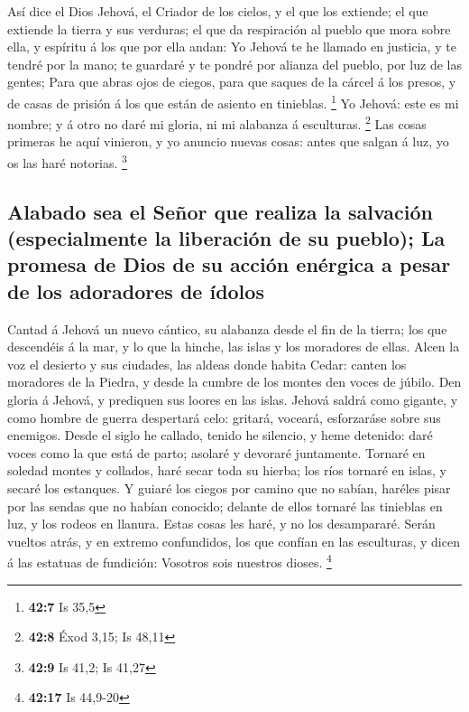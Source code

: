  Así dice el Dios Jehová, el Criador de los cielos, y el
que los extiende; el que extiende la tierra y sus verduras; el que da
respiración al pueblo que mora sobre ella, y espíritu á los que por ella
andan:  Yo Jehová te he llamado en justicia, y te tendré
por la mano; te guardaré y te pondré por alianza del pueblo, por luz de
las gentes;  Para que abras ojos de ciegos, para que
saques de la cárcel á los presos, y de casas de prisión á los que están
de asiento en tinieblas. \footnote{\textbf{42:7} Is 35,5} 
Yo Jehová: este es mi nombre; y á otro no daré mi gloria, ni mi alabanza
á esculturas. \footnote{\textbf{42:8} Éxod 3,15; Is 48,11}
 Las cosas primeras he aquí vinieron, y yo anuncio nuevas
cosas: antes que salgan á luz, yo os las haré notorias. \footnote{\textbf{42:9}
  Is 41,2; Is 41,27}

\hypertarget{alabado-sea-el-seuxf1or-que-realiza-la-salvaciuxf3n-especialmente-la-liberaciuxf3n-de-su-pueblo-la-promesa-de-dios-de-su-acciuxf3n-enuxe9rgica-a-pesar-de-los-adoradores-de-uxeddolos}{%
\subsection{Alabado sea el Señor que realiza la salvación (especialmente
la liberación de su pueblo); La promesa de Dios de su acción enérgica a
pesar de los adoradores de
ídolos}\label{alabado-sea-el-seuxf1or-que-realiza-la-salvaciuxf3n-especialmente-la-liberaciuxf3n-de-su-pueblo-la-promesa-de-dios-de-su-acciuxf3n-enuxe9rgica-a-pesar-de-los-adoradores-de-uxeddolos}}

 Cantad á Jehová un nuevo cántico, su alabanza desde el
fin de la tierra; los que descendéis á la mar, y lo que la hinche, las
islas y los moradores de ellas.  Alcen la voz el desierto
y sus ciudades, las aldeas donde habita Cedar: canten los moradores de
la Piedra, y desde la cumbre de los montes den voces de júbilo.
 Den gloria á Jehová, y prediquen sus loores en las
islas.  Jehová saldrá como gigante, y como hombre de
guerra despertará celo: gritará, voceará, esforzaráse sobre sus
enemigos.  Desde el siglo he callado, tenido he silencio,
y heme detenido: daré voces como la que está de parto; asolaré y
devoraré juntamente.  Tornaré en soledad montes y
collados, haré secar toda su hierba; los ríos tornaré en islas, y secaré
los estanques.  Y guiaré los ciegos por camino que no
sabían, haréles pisar por las sendas que no habían conocido; delante de
ellos tornaré las tinieblas en luz, y los rodeos en llanura. Estas cosas
les haré, y no los desampararé.  Serán vueltos atrás, y
en extremo confundidos, los que confían en las esculturas, y dicen á las
estatuas de fundición: Vosotros sois nuestros dioses. \footnote{\textbf{42:17}
  Is 44,9-20}

